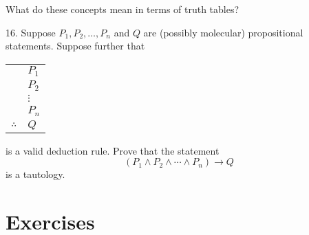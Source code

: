 \documentclass[10pt,]{book}
\theoremstyle{plain}
\theoremstyle{definition}
\numberwithin{equation}{chapter}
\newcommand{\hrulethin}  {\noalign{\hrule height 0.04em}}
\def\imp{\rightarrow}
\begin{document}
\begin{exerciselist}
          What do these concepts mean in terms of truth tables?
\item[16.]\hypertarget{exercise-241}{}
          Suppose \(P_1, P_2, \ldots, P_n\) and \(Q\) are (possibly molecular) propositional statements.  Suppose further that
          \leavevmode%
\begin{table}
\centering
\begin{tabular}{ll}
&\(P_1\)\tabularnewline[0pt]
&\(P_2\)\tabularnewline[0pt]
&\(\vdots\)\tabularnewline[0pt]
&\(P_n\)\tabularnewline\hrulethin
\(\therefore\)&\(Q\)
\end{tabular}
\end{table}

          is a valid deduction rule.  Prove that the statement
          \begin{equation*}
            (P_1 \wedge P_2 \wedge \cdots \wedge P_n) \imp Q
          \end{equation*}
          is a tautology.
\par\smallskip
\end{exerciselist}
\typeout{************************************************}
\typeout{************************************************}
\section[Exercises]{Exercises}\label{section-19}
\typeout{************************************************}
\typeout{************************************************}
\end{document}
